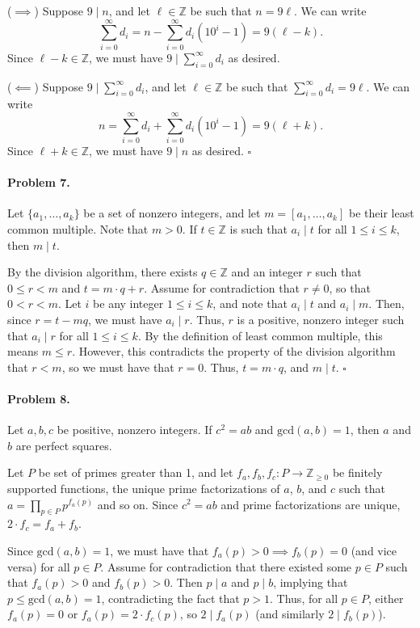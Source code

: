 \documentclass[12pt]{article}
\begin{document}
($\implies$) Suppose $9 \mid n$, and let $\ell \in \mathbb Z$ be such that $n = 9\ell$. We can write
\[\sum_{i=0}^\infty d_i = n - \sum_{i=0}^\infty d_i (10^i-1) = 9(\ell - k). \]
Since $\ell - k \in \mathbb Z$, we must have $9 \mid \sum_{i=0}^\infty d_i$ as desired.

($\impliedby$) Suppose $9 \mid \sum_{i=0}^\infty d_i$, and let $\ell \in \mathbb Z$ be such that $\sum_{i=0}^\infty d_i = 9\ell$. We can write
\[n = \sum_{i=0}^\infty d_i + \sum_{i=0}^\infty d_i (10^i-1) = 9(\ell + k). \]
Since $\ell + k \in \mathbb Z$, we must have $9 \mid n$ as desired. $\square$

\paragraph{Problem 7.} Let $\{a_1,\dots,a_k\}$ be a set of nonzero integers, and let $m=[a_1,\dots,a_k]$ be their least common multiple. Note that $m > 0$. If $t \in \mathbb Z$ is such that $a_i \mid t$ for all $1 \le i \le k$, then $m \mid t$.

By the division algorithm, there exists $q \in \mathbb Z$ and an integer $r$ such that $0 \le r < m$ and $t = m \cdot q + r$. Assume for contradiction that $r \ne 0$, so that $0 < r < m$. Let $i$ be any integer $1 \le i \le k$, and note that $a_i \mid t$ and $a_i \mid m$. Then, since $r = t - mq$, we must have $a_i \mid r$. Thus, $r$ is a positive, nonzero integer such that $a_i \mid r$ for all $1 \le i \le k$. By the definition of least common multiple, this means $m \le r$. However, this contradicts the property of the division algorithm that $r < m$, so we must have that $r = 0$. Thus, $t = m \cdot q$, and $m \mid t$. $\square$

\newpage{}
\paragraph{Problem 8.} Let $a,b,c$ be positive, nonzero integers. If $c^2 = ab$ and $\mathrm{gcd}(a, b) = 1$, then $a$ and $b$ are perfect squares.

Let $P$ be set of primes greater than 1, and let $f_a, f_b, f_c : P \to \mathbb Z_{\ge 0}$ be finitely supported functions, the unique prime factorizations of $a$, $b$, and $c$ such that $a = \prod_{p \in P} p^{f_a(p)}$ and so on. Since $c^2 = ab$ and prime factorizations are unique, $2\cdot f_c = f_a + f_b$. 

Since $\mathrm{gcd}(a,b) =1$, we must have that $f_a(p) > 0 \implies f_b(p) = 0$ (and vice versa) for all $p \in P$. Assume for contradiction that there existed some $p \in P$ such that $f_a(p) > 0$ and $f_b(p) > 0$. Then $p \mid a$ and $p \mid b$, implying that $p \le \mathrm{gcd}(a,b) = 1$, contradicting the fact that $p > 1$. Thus, for all $p \in P$, either $f_a(p) = 0$ or $f_a(p) = 2 \cdot f_c(p)$, so $2 \mid f_a(p)$ (and similarly $2 \mid f_b(p)$). 
\end{document}
